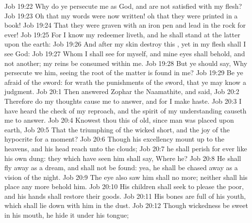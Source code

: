\vs Job 19:22 Why do ye persecute me as God, and are not satisfied with my flesh?
\vs Job 19:23 Oh that my words were now written! oh that they were printed in a book!
\vs Job 19:24 That they were graven with an iron pen and lead in the rock for ever!
\vs Job 19:25 For I know  my redeemer liveth, and  he shall stand at the latter  upon the earth:
\vs Job 19:26 And  after my skin  destroy this , yet in my flesh shall I see God:
\vs Job 19:27 Whom I shall see for myself, and mine eyes shall behold, and not another;  my reins be consumed within me.
\vs Job 19:28 But ye should say, Why persecute we him, seeing the root of the matter is found in me?
\vs Job 19:29 Be ye afraid of the sword: for wrath  the punishments of the sword, that ye may know  a judgment.
\vs Job 20:1 Then answered Zophar the Naamathite, and said,
\vs Job 20:2 Therefore do my thoughts cause me to answer, and for  I make haste.
\vs Job 20:3 I have heard the check of my reproach, and the spirit of my understanding causeth me to answer.
\vs Job 20:4 Knowest thou  this of old, since man was placed upon earth,
\vs Job 20:5 That the triumphing of the wicked  short, and the joy of the hypocrite  for a moment?
\vs Job 20:6 Though his excellency mount up to the heavens, and his head reach unto the clouds;
\vs Job 20:7  he shall perish for ever like his own dung: they which have seen him shall say, Where  he?
\vs Job 20:8 He shall fly away as a dream, and shall not be found: yea, he shall be chased away as a vision of the night.
\vs Job 20:9 The eye also  saw him shall  no more; neither shall his place any more behold him.
\vs Job 20:10 His children shall seek to please the poor, and his hands shall restore their goods.
\vs Job 20:11 His bones are full  of his youth, which shall lie down with him in the dust.
\vs Job 20:12 Though wickedness be sweet in his mouth,  he hide it under his tongue;
